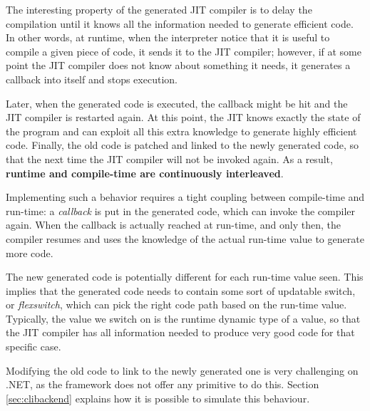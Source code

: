 The interesting property of the generated JIT compiler is to delay the
compilation until it knows all the information needed to generate
efficient code.  In other words, at runtime, when the interpreter notice
that it is useful to compile a given piece of code, it sends it to the
JIT compiler; however, if at some point the JIT compiler does not know
about something it needs, it generates a callback into itself and stops
execution.

Later, when the generated code is executed, the callback might be hit and the JIT
compiler is restarted again.  At this point, the JIT knows exactly the state
of the program and can exploit all this extra knowledge to generate highly
efficient code.  Finally, the old code is patched and linked to the newly
generated code, so that the next time the JIT compiler will not be invoked
again.  As a result, \textbf{runtime and compile-time are continuously
interleaved}. 

Implementing such a behavior requires a tight coupling between compile-time
and run-time: a \emph{callback} is put in the generated code, which can invoke
the compiler again.  When the callback is actually reached at run-time, and
only then, the compiler resumes and uses the knowledge of the actual run-time
value to generate more code.

The new generated code is potentially different for each run-time value seen.
This implies that the generated code needs to contain some sort of updatable
switch, or \emph{flexswitch}, which can pick the right code path based on the
run-time value.  Typically, the value we switch on is the runtime dynamic type
of a value, so that the JIT compiler has all information needed to produce
very good code for that specific case.


Modifying the old code to link to the newly generated one is very challenging on
.NET, as the framework does not offer any primitive to do this.  Section
\ref{sec:clibackend} explains how it is possible to simulate this behaviour.


